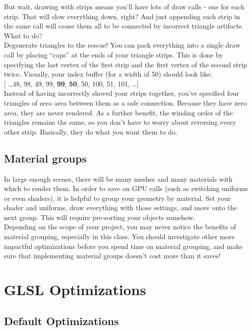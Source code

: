\documentclass{scrartcl}
\begin{document}
But wait,  drawing with strips means you'll have lots of draw calls - one for each strip. That will slow everything down, right? And just appending each strip in the same call will cause them all to be connected by incorrect triangle artifacts. What to do?\\

Degenerate triangles to the rescue! You can pack everything into a single draw call by placing ``caps'' at the ends of your triangle strips. This is done by specifying the last vertex of the first strip and the first vertex of the second strip twice. Visually, your index buffer (for a width of 50) should look like:\\

[ \ldots 48, 98, 49, 99, \textbf{99}, \textbf{50}, 50, 100, 51, 101, \ldots ]\\

Instead of having incorrectly shoved your strips together, you've specified four triangles of zero area between them as a safe connection. Because they have zero area, they are never rendered. As a further benefit, the winding order of the triangles remains the same, so you don't have to worry about reversing every other strip. Basically, they do what you want them to do.

\subsection{ Material groups }

In large enough scenes, there will be many meshes and many materials with which to render them. In order to save on GPU calls (such as switching uniforms or even shaders), it is helpful to group your geometry by material. Set your shader and uniforms, draw everything with those settings, and move onto the next group. This will require pre-sorting your objects somehow.\\

Depending on the scope of your project, you may never notice the benefits of material grouping, especially in this class. You should investigate other more impactful optimizations before you spend time on material grouping, and make sure that implementing material groups doesn't cost more than it saves!

\section{ GLSL Optimizations }

\subsection{ Default Optimizations }
\end{document}
